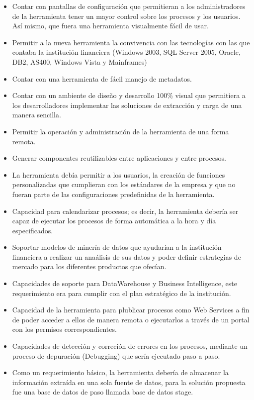 \documentclass[a4paper,openright,12pt]{book}
\begin{document}
\begin{itemize}
\item Contar con pantallas de configuraci\'on que permitieran a los administradores de la herramienta tener un mayor control sobre los procesos y los usuarios. As\'i mismo, que fuera una herramienta visualmente f\'acil de usar.
\item Permitir a la nueva herramienta la convivencia con las tecnolog\'ias con las que contaba la instituci\'on financiera (Windows 2003, SQL Server 2005, Oracle, DB2, AS400, Windows Vista y Mainframes)
\item Contar con una herramienta de f\'acil manejo de metadatos. 
\item Contar con un ambiente de dise\~no y desarrollo 100\% visual que permitiera a los desarrolladores implementar las soluciones de extracci\'on y carga de una manera sencilla.
\item Permitir la operaci\'on y administraci\'on de la herramienta de una forma remota.
\item Generar componentes reutilizables entre aplicaciones y entre procesos.
\item La herramienta deb\'ia permitir a los usuarios, la creaci\'on de funciones personalizadas que cumplieran con los est\'andares de la empresa y que no fueran parte de las configuraciones predefinidas de la herramienta.
\item Capacidad para calendarizar procesos; es decir, la herramienta deber\'ia ser capaz de ejecutar los procesos de forma autom\'atica a la hora y d\'ia especificados.
\item Soportar modelos de miner\'ia de datos que ayudar\'ian  a la instituci\'on financiera a realizar un ana\'alisis de sus datos y poder definir estrategias de mercado para los diferentes productos que ofec\'ian.
\item Capacidades de soporte para DataWarehouse y Business Intelligence, este requerimiento era para cumplir con el plan estrat\'egico de la instituci\'on. 
\item Capacidad de la herramienta para plublicar procesos como Web Services a fin de poder acceder a ellos de manera remota o ejecutarlos a trav\'es de un portal con los permisos correspondientes. 
\item Capacidades de detecci\'on y correci\'on de errores en los procesos, mediante un proceso de depuraci\'on (Debugging) que ser\'ia ejecutado paso a paso.
\item Como un requerimiento b\'asico, la herramienta deber\'ia de almacenar la informaci\'on extra\'ida en una sola fuente de datos, para la soluci\'on propuesta fue una base de datos de paso llamada base de datos stage.

\end{itemize}
\end{document}
